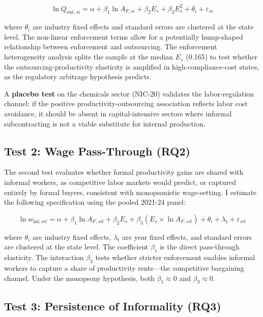\begin{equation}
	\ln Q_{\text{out},si} = \alpha + \beta_1 \ln A_{F,si} + \beta_2 E_s + \beta_3 E_s^2 + \theta_i + \varepsilon_{si}
\end{equation}

where $\theta_i$ are industry fixed effects and standard errors are clustered at the state level. The non-linear enforcement terms allow for a potentially hump-shaped relationship between enforcement and outsourcing. The enforcement heterogeneity analysis splits the sample at the median $E_s$ (0.165) to test whether the outsourcing-productivity elasticity is amplified in high-compliance-cost states, as the regulatory arbitrage hypothesis predicts.

A \textbf{placebo test} on the chemicals sector (NIC-20) validates the labor-regulation channel: if the positive productivity-outsourcing association reflects labor cost avoidance, it should be absent in capital-intensive sectors where informal subcontracting is not a viable substitute for internal production.

\subsection{Test 2: Wage Pass-Through (RQ2)}

The second test evaluates whether formal productivity gains are shared with informal workers, as competitive labor markets would predict, or captured entirely by formal buyers, consistent with monopsonistic wage-setting. I estimate the following specification using the pooled 2021-24 panel:

\begin{equation}
	\ln w_{\text{inf},sit} = \alpha + \beta_1 \ln A_{F,sit} + \beta_2 E_s + \beta_3 (E_s \times \ln A_{F,sit}) + \theta_i + \lambda_t + \varepsilon_{sit}
\end{equation}

where $\theta_i$ are industry fixed effects, $\lambda_t$ are year fixed effects, and standard errors are clustered at the state level. The coefficient $\beta_1$ is the direct pass-through elasticity. The interaction $\beta_3$ tests whether stricter enforcement enables informal workers to capture a share of productivity rents—the competitive bargaining channel. Under the monopsony hypothesis, both $\beta_1 \approx 0$ and $\beta_3 \approx 0$.

\subsection{Test 3: Persistence of Informality (RQ3)}

